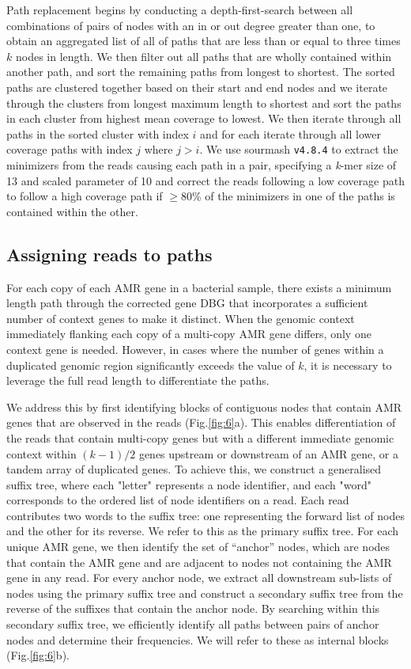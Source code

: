 Path replacement begins by conducting a depth-first-search between all combinations of pairs of nodes with an in or out degree greater than one, to obtain an aggregated list of all of paths that are less than or equal to three times $k$ nodes in length. We then filter out all paths that are wholly contained within another path, and sort the remaining paths from longest to shortest. The sorted paths are clustered together based on their start and end nodes and we iterate through the clusters from longest maximum length to shortest and sort the paths in each cluster from highest mean coverage to lowest. We then iterate through all paths in the sorted cluster with index $i$ and for each iterate through all lower coverage paths with index $j$ where $j > i$. We use sourmash \texttt{v4.8.4} \cite{Pierce2019} to extract the minimizers from the reads causing each path in a pair, specifying a \textit{k}-mer size of 13 and scaled parameter of 10 and correct the reads following a low coverage path to follow a high coverage path if $\ge$80\% of the minimizers in one of the paths is contained within the other.

\subsection*{Assigning reads to paths}

For each copy of each AMR gene in a bacterial sample, there exists a minimum length path through the corrected gene DBG that incorporates a sufficient number of context genes to make it distinct. When the genomic context immediately flanking each copy of a multi-copy AMR gene differs, only one context gene is needed. However, in cases where the number of genes within a duplicated genomic region significantly exceeds the value of $k$, it is necessary to leverage the full read length to differentiate the paths. 

We address this by first identifying blocks of contiguous nodes that contain AMR genes that are observed in the reads (Fig.\ref{fig:6}a). This enables differentiation of the reads that contain multi-copy genes but with a different immediate genomic context within $(k - 1) / 2$ genes upstream or downstream of an AMR gene, or a tandem array of duplicated genes. To achieve this, we construct a generalised suffix tree, where each "letter" represents a node identifier, and each "word" corresponds to the ordered list of node identifiers on a read. Each read contributes two words to the suffix tree: one representing the forward list of nodes and the other for its reverse. We refer to this as the primary suffix tree. For each unique AMR gene, we then identify the set of “anchor” nodes, which are nodes that contain the AMR gene and are adjacent to nodes not containing the AMR gene in any read. For every anchor node, we extract all downstream sub-lists of nodes using the primary suffix tree and construct a secondary suffix tree from the reverse of the suffixes that contain the anchor node. By searching within this secondary suffix tree, we efficiently identify all paths between pairs of anchor nodes and determine their frequencies. We will refer to these as internal blocks (Fig.\ref{fig:6}b).


